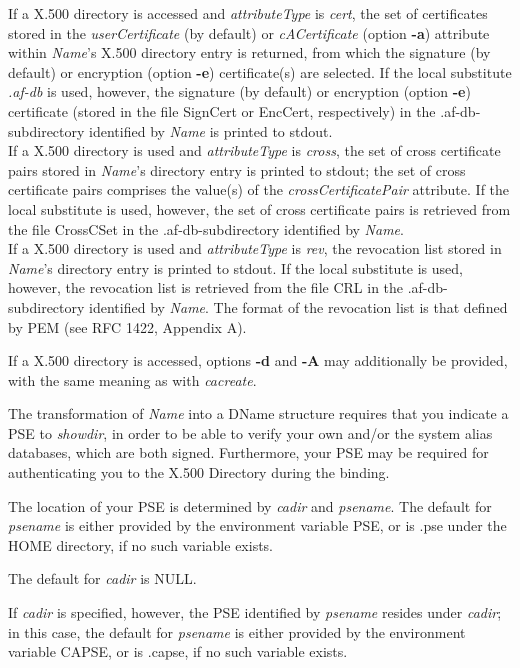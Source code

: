 If a X.500 directory is accessed and {\em attributeType} is {\em cert},
the set of certificates stored in the {\em userCertificate} (by default) or 
{\em cACertificate} (option {\bf -a}) attribute within {\em Name}'s X.500 directory entry
is returned, from which the signature (by default) or encryption (option {\bf -e}) certificate(s) 
are selected.
If the local substitute {\em .af-db} is used, however, the signature (by default) or encryption 
(option {\bf -e}) certificate (stored in the file SignCert or EncCert, respectively) in the 
.af-db-subdirectory identified by {\em Name} is printed to stdout. \\
If a X.500 directory is used and {\em attributeType} is {\em cross}, the set of cross certificate 
pairs stored in {\em Name}'s directory entry is printed to stdout; the set of 
cross certificate pairs comprises the value(s) of the {\em crossCertificatePair} attribute. 
If the local substitute is used, however, the set of cross certificate pairs is retrieved from the file CrossCSet in the .af-db-subdirectory identified by {\em Name}. \\
If a X.500 directory is used and {\em attributeType} is {\em rev}, the revocation list stored 
in {\em Name}'s directory entry is printed to stdout. 
If the local substitute is used, however, the revocation list is 
retrieved from the file CRL in the .af-db-subdirectory identified by {\em Name}.
The format of the revocation list is that defined by PEM (see RFC 1422, Appendix A).
 
If a X.500 directory is accessed, options {\bf -d} and {\bf -A} may additionally be
provided, with the same meaning as with {\em cacreate}.

The transformation of {\em Name} into a DName structure requires that you indicate a PSE
to {\em showdir}, in order to be able to verify your own and/or the system alias databases,
which are both signed. Furthermore, your PSE may be required for authenticating you
to the X.500 Directory during the binding.

The location of your PSE is determined by {\em cadir} and {\em psename}. The default for {\em 
psename} is either provided by the environment variable PSE, or is .pse under the HOME directory, if no such
variable exists.
 
The default for {\em cadir} is NULL. 

If {\em cadir} is specified,
however, the PSE identified by {\em psename} resides under {\em cadir}; in this case, the default
for {\em psename} is either provided by the environment variable CAPSE, or is .capse, if no such variable
exists.

